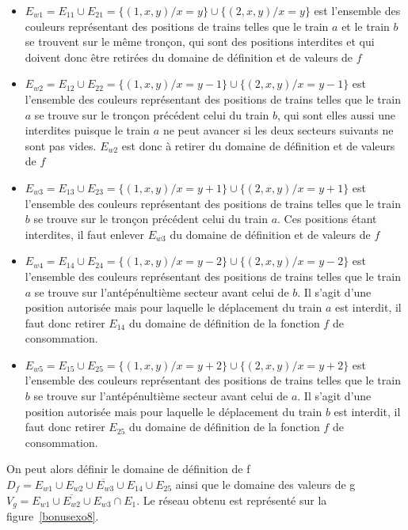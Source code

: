\begin{itemize}
    \item $E_{w1} = E_{11} \cup E_{21} = \{(1, x, y) / x = y \} \cup \{(2, x, y) / x = y \}$
        est l'ensemble des couleurs représentant des positions de trains telles que le train $a$ et
        le train $b$ se trouvent sur le même tronçon, qui sont des positions interdites et qui
        doivent donc être retirées du domaine de définition et de valeurs de $f$
    \item $E_{w2} = E_{12} \cup E_{22} = \{(1, x, y) / x = y - 1\} \cup \{(2, x, y) / x = y -
        1 \}$ est l'ensemble des couleurs représentant des positions de trains telles que le train
        $a$ se trouve sur le tronçon précédent celui du train $b$, qui sont elles aussi une
        interdites puisque le train $a$ ne peut avancer si les deux secteurs suivants ne sont pas
        vides. $E_{w2}$ est donc à retirer du domaine de définition et de valeurs de $f$
    \item $E_{w3} = E_{13} \cup E_{23} = \{(1, x, y) / x = y + 1\} \cup \{(2, x, y) / x = y +
        1 \}$ est l'ensemble des couleurs représentant des positions de trains telles que le train
        $b$ se trouve sur le tronçon précédent celui du train $a$. Ces positions étant interdites,
        il faut enlever $E_{w3}$ du domaine de définition et de valeurs de $f$
    \item $E_{w4} = E_{14} \cup E_{24} = \{(1, x, y) / x = y - 2\} \cup \{(2, x, y) / x = y - 2 \}$
        est l'ensemble des couleurs représentant des positions de trains telles que le train $a$ se
        trouve sur l'antépénultième secteur avant celui de $b$. Il s'agit d'une position autorisée
        mais pour laquelle le déplacement du train $a$ est interdit, il faut donc retirer $E_{14}$
        du domaine de définition de la fonction $f$ de consommation.
    \item $E_{w5} = E_{15} \cup E_{25} = \{(1, x, y) / x = y + 2\} \cup \{(2, x, y) / x = y + 2 \}$
        est l'ensemble des couleurs représentant des positions de trains telles que le train $b$ se
        trouve sur l'antépénultième secteur avant celui de $a$. Il s'agit d'une position autorisée
        mais pour laquelle le déplacement du train $b$ est interdit, il faut donc retirer $E_{25}$
        du domaine de définition de la fonction $f$ de consommation.
\end{itemize}

On peut alors définir le domaine de définition de f $D_f = \overline{E_{w1} \cup E_{w2} \cup E_{w3}
\cup E_{14} \cup E_{25}}$ ainsi que le domaine des valeurs de g $V_g = \overline{E_{w1} \cup E_{w2}
\cup E_{w3}} \cap E_1$. Le réseau obtenu est représenté sur la figure~\ref{bonusexo8}.

